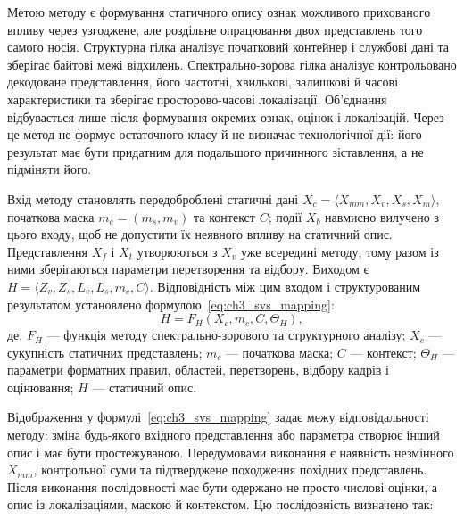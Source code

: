 Метою методу є формування статичного опису ознак можливого прихованого впливу через узгоджене, але роздільне опрацювання двох представлень того самого носія. Структурна гілка аналізує початковий контейнер і службові дані та зберігає байтові межі відхилень. Спектрально-зорова гілка аналізує контрольовано декодоване представлення, його частотні, хвилькові, залишкові й часові характеристики та зберігає просторово-часові локалізації. Об’єднання відбувається лише після формування окремих ознак, оцінок і локалізацій. Через це метод не формує остаточного класу й не визначає технологічної дії: його результат має бути придатним для подальшого причинного зіставлення, а не підміняти його.

Вхід методу становлять передоброблені статичні дані $X_c=\langle X_{mm},\allowbreak X_v,\allowbreak X_s,\allowbreak X_m\rangle$, початкова маска $m_c=(m_s,m_v)$ та контекст $C$; події $X_b$ навмисно вилучено з цього входу, щоб не допустити їх неявного впливу на статичний опис. Представлення $X_f$ і $X_t$ утворюються з $X_v$ уже всередині методу, тому разом із ними зберігаються параметри перетворення та відбору. Виходом є $H=\langle Z_v,\allowbreak Z_s,\allowbreak L_v,\allowbreak L_s,\allowbreak m_c,\allowbreak C\rangle$. Відповідність між цим входом і структурованим результатом установлено формулою~\eqref{eq:ch3_svs_mapping}:
\begin{equation}
H=F_H(X_c,m_c,C,\Theta_H),
\label{eq:ch3_svs_mapping}
\end{equation}
де, $F_H$ --- функція методу спектрально-зорового та структурного аналізу; $X_c$ --- сукупність статичних представлень; $m_c$ --- початкова маска; $C$ --- контекст; $\Theta_H$ --- параметри форматних правил, областей, перетворень, відбору кадрів і оцінювання; $H$ --- статичний опис.

Відображення у формулі~\eqref{eq:ch3_svs_mapping} задає межу відповідальності методу: зміна будь-якого вхідного представлення або параметра створює інший опис і має бути простежуваною. Передумовами виконання є наявність незмінного $X_{mm}$, контрольної суми та підтверджене походження похідних представлень. Після виконання послідовності має бути одержано не просто числові оцінки, а опис із локалізаціями, маскою й контекстом. Цю послідовність визначено так:


